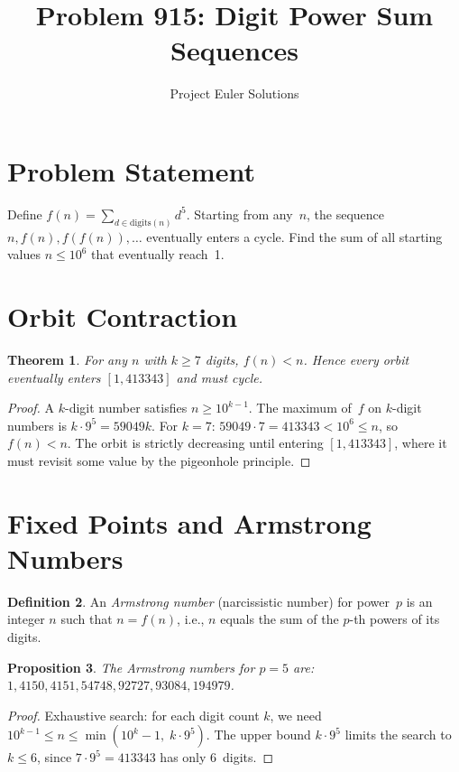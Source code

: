 \documentclass[11pt]{article}
\title{Problem 915: Digit Power Sum Sequences}
\author{Project Euler Solutions}
\date{}
\newtheorem{theorem}{Theorem}
\newtheorem{proposition}[theorem]{Proposition}
\theoremstyle{definition}
\newtheorem{definition}[theorem]{Definition}
\begin{document}
\maketitle

\section{Problem Statement}

Define $f(n) = \sum_{d \in \mathrm{digits}(n)} d^5$. Starting from any~$n$, the sequence $n, f(n), f(f(n)), \ldots$ eventually enters a cycle. Find the sum of all starting values $n \leq 10^6$ that eventually reach~1.

\section{Orbit Contraction}

\begin{theorem}
For any $n$ with $k \geq 7$ digits, $f(n) < n$. Hence every orbit eventually enters $[1, 413343]$ and must cycle.
\end{theorem}

\begin{proof}
A $k$-digit number satisfies $n \geq 10^{k-1}$. The maximum of~$f$ on $k$-digit numbers is $k \cdot 9^5 = 59049k$. For $k = 7$: $59049 \cdot 7 = 413343 < 10^6 \leq n$, so $f(n) < n$. The orbit is strictly decreasing until entering $[1, 413343]$, where it must revisit some value by the pigeonhole principle.
\end{proof}

\section{Fixed Points and Armstrong Numbers}

\begin{definition}
An \emph{Armstrong number} (narcissistic number) for power~$p$ is an integer $n$ such that $n = f(n)$, i.e., $n$ equals the sum of the $p$-th powers of its digits.
\end{definition}

\begin{proposition}
The Armstrong numbers for $p = 5$ are: $1, 4150, 4151, 54748, 92727, 93084, 194979$.
\end{proposition}

\begin{proof}
Exhaustive search: for each digit count $k$, we need $10^{k-1} \leq n \leq \min(10^k - 1,\; k \cdot 9^5)$. The upper bound $k \cdot 9^5$ limits the search to $k \leq 6$, since $7 \cdot 9^5 = 413343$ has only 6~digits.
\end{proof}
\end{document}
